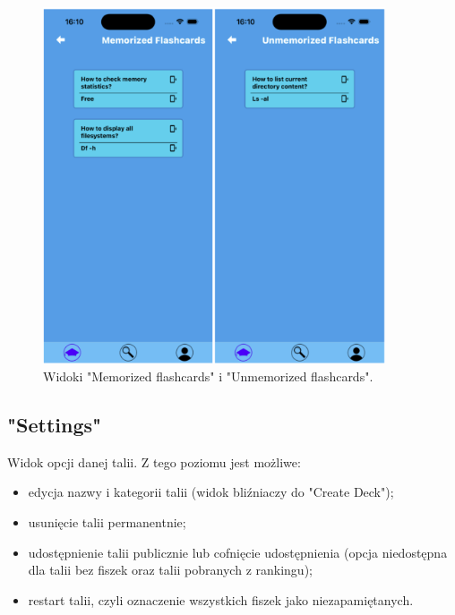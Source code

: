 \begin{figure}[H]
    \centering
    \includegraphics[width=0.9\textwidth]{chapters/chapter_10/images_mobile/mobile_memorized}
    \caption{Widoki "Memorized flashcards" i "Unmemorized flashcards".}
    \label{img:mobile_memorized}
\end{figure}

\subsection{"Settings"}
Widok opcji danej talii. Z tego poziomu jest możliwe:
\begin{itemize}
    \item edycja nazwy i kategorii talii (widok bliźniaczy do "Create Deck");
    \item usunięcie talii permanentnie;
    \item udostępnienie talii publicznie lub cofnięcie udostępnienia (opcja niedostępna dla talii bez fiszek oraz talii pobranych z rankingu);
    \item restart talii, czyli oznaczenie wszystkich fiszek jako niezapamiętanych.
\end{itemize}


